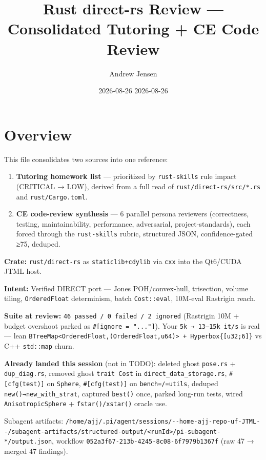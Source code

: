 \documentclass[11pt]{article}
\author{Andrew Jensen}
\date{2026-08-26 2026-08-26}
\title{Rust direct-rs Review — Consolidated Tutoring + CE Code Review}
\begin{document}
\maketitle

\section{Overview}
\label{sec:orgc37568d}
This file consolidates two sources into one reference:

\begin{enumerate}
\item \textbf{Tutoring homework list} — prioritized by \texttt{rust-skills} rule impact (CRITICAL → LOW), derived from a full read of \texttt{rust/direct-rs/src/*.rs} and \texttt{rust/Cargo.toml}.
\item \textbf{CE code-review synthesis} — 6 parallel persona reviewers (correctness, testing, maintainability, performance, adversarial, project-standards), each forced through the \texttt{rust-skills} rubric, structured JSON, confidence-gated ≥75, deduped.
\end{enumerate}

\textbf{\textbf{Crate:}} \texttt{rust/direct-rs} as \texttt{staticlib+cdylib} via \texttt{cxx} into the Qt6/CUDA JTML host.

\textbf{\textbf{Intent:}} Verified DIRECT port — Jones POH/convex-hull, trisection, volume tiling, \texttt{OrderedFloat} determinism, batch \texttt{Cost::eval}, 10M-eval Rastrigin reach.

\textbf{\textbf{Suite at review:}} \texttt{46 passed / 0 failed / 2 ignored} (Rastrigin 10M + budget overshoot parked as \texttt{\#[ignore = "..."]}). Your \texttt{5k → 13–15k it/s} is real — lean \texttt{BTreeMap<OrderedFloat,(OrderedFloat,u64)> + Hyperbox\{[u32;6]\}} vs C++ \texttt{std::map} churn.

\textbf{\textbf{Already landed this session}} (not in TODO): deleted ghost \texttt{pose.rs} + \texttt{dup\_diag.rs}, removed ghost \texttt{trait Cost} in \texttt{direct\_data\_storage.rs}, \texttt{\#[cfg(test)]} on \texttt{Sphere}, \texttt{\#[cfg(test)]} on \texttt{bench=/=utils}, deduped \texttt{new()→new\_with\_strat}, captured \texttt{best()} once, parked long-run tests, wired \texttt{AnisotropicSphere} + \texttt{fstar()/xstar()} oracle use.

Subagent artifacts: \texttt{/home/ajj/.pi/agent/sessions/-{}-{}home-ajj-repo-uf-JTML-{}-{}/subagent-artifacts/structured-output/<runId>/pi-subagent-*/output.json}, workflow \texttt{052a3f67-213b-4245-8c08-6f7979b1367f} (raw 47 → merged 47 findings).
\end{document}
